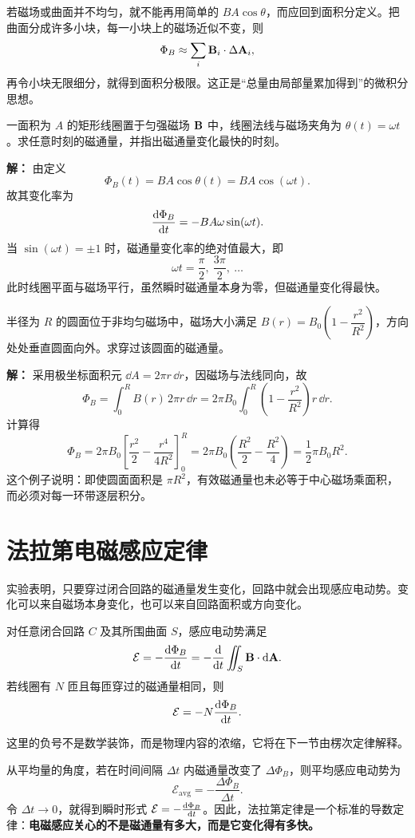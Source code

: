 若磁场或曲面并不均匀，就不能再用简单的 $BA\cos\theta$，而应回到面积分定义。把曲面分成许多小块，每一小块上的磁场近似不变，则
\[
\Phi_B\approx \sum_i \vb{B}_i\cdot \Delta \vb{A}_i,
\]
再令小块无限细分，就得到面积分极限。这正是“总量由局部量累加得到”的微积分思想。

\begin{example}
一面积为 $A$ 的矩形线圈置于匀强磁场 $\vb{B}$ 中，线圈法线与磁场夹角为 $\theta(t)=\omega t$。求任意时刻的磁通量，并指出磁通量变化最快的时刻。

\textbf{解：} 由定义
\[
\Phi_B(t)=BA\cos \theta(t)=BA\cos(\omega t).
\]
故其变化率为
\[
\dv{\Phi_B}{t}=-BA\omega \sin(\omega t).
\]
当 $\sin(\omega t)=\pm 1$ 时，磁通量变化率的绝对值最大，即
\[
\omega t=\frac{\pi}{2},\ \frac{3\pi}{2},\ \dots
\]
此时线圈平面与磁场平行，虽然瞬时磁通量本身为零，但磁通量变化得最快。
\end{example}

\begin{example}
半径为 $R$ 的圆面位于非均匀磁场中，磁场大小满足 $B(r)=B_0\left(1-\dfrac{r^2}{R^2}\right)$，方向处处垂直圆面向外。求穿过该圆面的磁通量。

\textbf{解：} 采用极坐标面积元 $\dd A=2\pi r\,\dd r$，因磁场与法线同向，故
\[
\Phi_B=\int_0^R B(r)\,2\pi r\,\dd r
=2\pi B_0 \int_0^R \left(1-\frac{r^2}{R^2}\right)r\,\dd r.
\]
计算得
\[
\Phi_B=2\pi B_0\left[\frac{r^2}{2}-\frac{r^4}{4R^2}\right]_0^R
=2\pi B_0\left(\frac{R^2}{2}-\frac{R^2}{4}\right)
=\frac{1}{2}\pi B_0 R^2.
\]
这个例子说明：即使圆面面积是 $\pi R^2$，有效磁通量也未必等于中心磁场乘面积，而必须对每一环带逐层积分。
\end{example}

\section{法拉第电磁感应定律}

实验表明，只要穿过闭合回路的磁通量发生变化，回路中就会出现感应电动势。变化可以来自磁场本身变化，也可以来自回路面积或方向变化。

\begin{law}[法拉第电磁感应定律]
对任意闭合回路 $C$ 及其所围曲面 $S$，感应电动势满足
\[
\mathcal{E}=-\dv{\Phi_B}{t}=-\dv{}{t}\iint_S \vb{B}\cdot \dd \vb{A}.
\]
若线圈有 $N$ 匝且每匝穿过的磁通量相同，则
\[
\mathcal{E}=-N\dv{\Phi_B}{t}.
\]
\end{law}

这里的负号不是数学装饰，而是物理内容的浓缩，它将在下一节由楞次定律解释。

从平均量的角度，若在时间间隔 $\Delta t$ 内磁通量改变了 $\Delta \Phi_B$，则平均感应电动势为
\[
\mathcal{E}_{\text{avg}}=-\frac{\Delta \Phi_B}{\Delta t}.
\]
令 $\Delta t\to 0$，就得到瞬时形式 $\mathcal{E}=-\dv{\Phi_B}{t}$。因此，法拉第定律是一个标准的导数定律：\textbf{电磁感应关心的不是磁通量有多大，而是它变化得有多快。}

